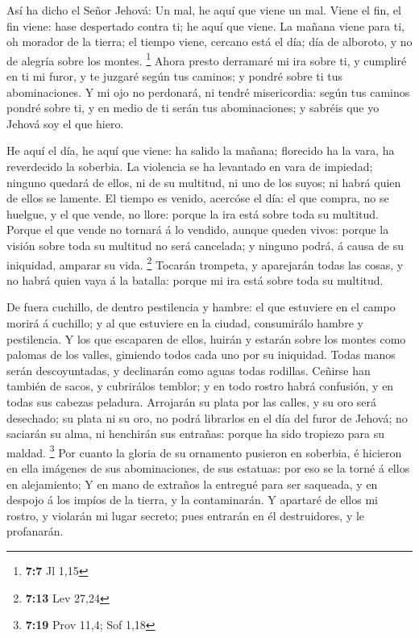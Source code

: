  Así ha dicho el Señor Jehová: Un mal, he aquí que viene
un mal.  Viene el fin, el fin viene: hase despertado
contra ti; he aquí que viene.  La mañana viene para ti, oh
morador de la tierra; el tiempo viene, cercano está el día; día de
alboroto, y no de alegría sobre los montes. \footnote{\textbf{7:7} Jl
  1,15}  Ahora presto derramaré mi ira sobre ti, y
cumpliré en ti mi furor, y te juzgaré según tus caminos; y pondré sobre
ti tus abominaciones.  Y mi ojo no perdonará, ni tendré
misericordia: según tus caminos pondré sobre ti, y en medio de ti serán
tus abominaciones; y sabréis que yo Jehová soy el que hiero.

 He aquí el día, he aquí que viene: ha salido la mañana;
florecido ha la vara, ha reverdecido la soberbia.  La
violencia se ha levantado en vara de impiedad; ninguno quedará de ellos,
ni de su multitud, ni uno de los suyos; ni habrá quien de ellos se
lamente.  El tiempo es venido, acercóse el día: el que
compra, no se huelgue, y el que vende, no llore: porque la ira está
sobre toda su multitud.  Porque el que vende no tornará á
lo vendido, aunque queden vivos: porque la visión sobre toda su multitud
no será cancelada; y ninguno podrá, á causa de su iniquidad, amparar su
vida. \footnote{\textbf{7:13} Lev 27,24}  Tocarán
trompeta, y aparejarán todas las cosas, y no habrá quien vaya á la
batalla: porque mi ira está sobre toda su multitud.

 De fuera cuchillo, de dentro pestilencia y hambre: el
que estuviere en el campo morirá á cuchillo; y al que estuviere en la
ciudad, consumirálo hambre y pestilencia.  Y los que
escaparen de ellos, huirán y estarán sobre los montes como palomas de
los valles, gimiendo todos cada uno por su iniquidad. 
Todas manos serán descoyuntadas, y declinarán como aguas todas rodillas.
 Ceñirse han también de sacos, y cubrirálos temblor; y en
todo rostro habrá confusión, y en todas sus cabezas peladura.
 Arrojarán su plata por las calles, y su oro será
desechado; su plata ni su oro, no podrá librarlos en el día del furor de
Jehová; no saciarán su alma, ni henchirán sus entrañas: porque ha sido
tropiezo para su maldad. \footnote{\textbf{7:19} Prov 11,4; Sof 1,18}
 Por cuanto la gloria de su ornamento pusieron en
soberbia, é hicieron en ella imágenes de sus abominaciones, de sus
estatuas: por eso se la torné á ellos en alejamiento;  Y
en mano de extraños la entregué para ser saqueada, y en despojo á los
impíos de la tierra, y la contaminarán.  Y apartaré de
ellos mi rostro, y violarán mi lugar secreto; pues entrarán en él
destruidores, y le profanarán.

